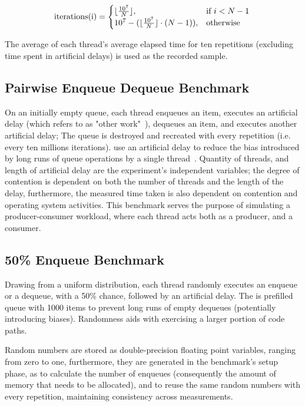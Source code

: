 \[
    \text{iterations(i)} = 
    \begin{cases}
        \lfloor\frac{10^7}{N}\rfloor, & \text{if}~i < N-1 \\
        10^7 - (\lfloor \frac{10^7}{N} \rfloor \cdot (N-1)), & \text{otherwise}
    \end{cases} \\
\]

The average of each thread's average elapsed time for ten repetitions
(excluding time spent in artificial delays) is
used as the recorded sample.

\subsection{Pairwise Enqueue Dequeue Benchmark}

On an initially empty queue, each thread enqueues an item, executes an
artificial delay (which \citeauthor{michael1996simple} refers to as "other
work"~\citep{michael1996simple}), dequeues an item, and executes another
artificial delay; The queue is destroyed and recreated with every repetition
(i.e. every ten millions iterations). \citeauthor{michael1996simple} use an
artificial delay to reduce the bias introduced by long runs of queue operations
by a single thread~\citep{michael1996simple}. Quantity of threads, and length
of artificial delay are the experiment's independent variables; the
degree of contention is dependent on both the number of threads and the length
of the delay, furthermore, the measured time taken is also dependent on
contention and operating system activities. This benchmark serves the purpose
of simulating a producer-consumer workload, where each thread acts both as a
producer, and a consumer.

\subsection{50\% Enqueue Benchmark}
Drawing from a uniform distribution, each thread randomly executes an enqueue
or a dequeue, with a 50\% chance,
followed by an artificial delay. The is prefilled queue with 1000
items to prevent long runs of empty dequeues (potentially introducing biases). Randomness aids with exercising a
larger portion of code paths.

Random numbers are stored as double-precision floating point variables, ranging
from zero to one, furthermore, they are generated in the benchmark's setup
phase, as to calculate the number of enqueues (consequently the
amount of memory that needs to be allocated), and to reuse the same random
numbers with every repetition, maintaining consistency across measurements. 

